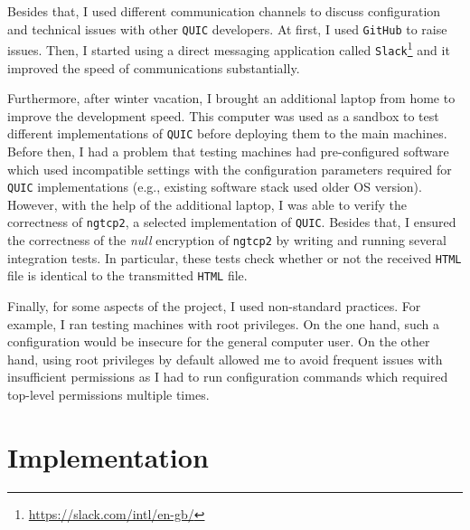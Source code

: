 \documentclass[12pt,a4paper]{report}
\begin{document}
    Besides that, I used different communication channels to discuss configuration and technical issues with other \texttt{QUIC} developers.
    At first, I used \texttt{GitHub} to raise issues.
    Then, I started using a direct messaging application called \texttt{Slack}\footnote{\url{https://slack.com/intl/en-gb/}} 
    and it improved the speed of communications substantially.

    Furthermore, after winter vacation, I brought an additional laptop from home to improve the development speed.
    This computer was used as a sandbox to test different implementations of \texttt{QUIC} before deploying them to the main machines.
    Before then, I had a problem that testing machines had pre-configured software which used incompatible settings with the configuration parameters required for \texttt{QUIC} implementations (e.g., existing software stack used older OS version).
    However, with the help of the additional laptop, I was able to verify the correctness of \texttt{ngtcp2}, a selected implementation of \texttt{QUIC}.
    Besides that, I ensured the correctness of the \textit{null} encryption of \texttt{ngtcp2} by writing and running several integration tests.
    In particular, these tests check whether or not the received \texttt{HTML} file is identical to the transmitted \texttt{HTML} file.
    
    Finally, for some aspects of the project, I used non-standard practices.
    For example, I ran testing machines with root privileges.
    On the one hand, such a configuration would be insecure for the general computer user. On the other hand, using root privileges by default allowed me to avoid frequent issues with insufficient permissions as I had to run configuration commands which required top-level permissions multiple times.
    
    

\chapter{Implementation}


\end{document}
